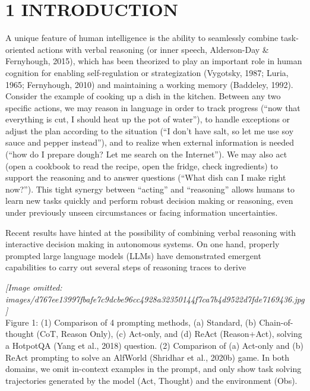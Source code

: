 \documentclass[
]{article}
\begin{document}
\section{1 INTRODUCTION}\label{introduction}

A unique feature of human intelligence is the ability to seamlessly
combine task-oriented actions with verbal reasoning (or inner speech,
Alderson-Day \& Fernyhough, 2015), which has been theorized to play an
important role in human cognition for enabling self-regulation or
strategization (Vygotsky, 1987; Luria, 1965; Fernyhough, 2010) and
maintaining a working memory (Baddeley, 1992). Consider the example of
cooking up a dish in the kitchen. Between any two specific actions, we
may reason in language in order to track progress (``now that everything
is cut, I should heat up the pot of water''), to handle exceptions or
adjust the plan according to the situation (``I don't have salt, so let
me use soy sauce and pepper instead''), and to realize when external
information is needed (``how do I prepare dough? Let me search on the
Internet''). We may also act (open a cookbook to read the recipe, open
the fridge, check ingredients) to support the reasoning and to answer
questions (``What dish can I make right now?''). This tight synergy
between ``acting'' and ``reasoning'' allows humans to learn new tasks
quickly and perform robust decision making or reasoning, even under
previously unseen circumstances or facing information uncertainties.

Recent results have hinted at the possibility of combining verbal
reasoning with interactive decision making in autonomous systems. On one
hand, properly prompted large language models (LLMs) have demonstrated
emergent capabilities to carry out several steps of reasoning traces to
derive

\textit{[Image omitted: images/d767ee13997fbafe7c9dcbe96cc4928a32350144f7ca7b4d9522d7fde7169436.jpg]}\\
Figure 1: (1) Comparison of 4 prompting methods, (a) Standard, (b)
Chain-of-thought (CoT, Reason Only), (c) Act-only, and (d) ReAct
(Reason+Act), solving a HotpotQA (Yang et al., 2018) question. (2)
Comparison of (a) Act-only and (b) ReAct prompting to solve an AlfWorld
(Shridhar et al., 2020b) game. In both domains, we omit in-context
examples in the prompt, and only show task solving trajectories
generated by the model (Act, Thought) and the environment (Obs).
\end{document}
